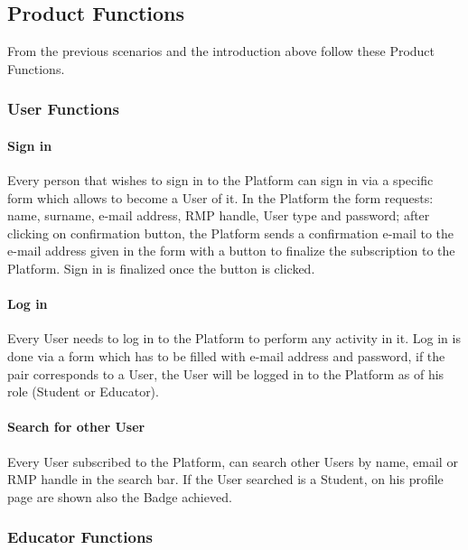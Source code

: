 \subsection{Product Functions}
From the previous scenarios and the introduction above follow these Product Functions.

\subsubsection{User Functions}
\paragraph{Sign in}
Every person that wishes to sign in to the Platform can sign in via a specific form which allows to become a User of it.
In the Platform the form requests: name, surname, e-mail address, RMP handle, User type and password; after clicking on confirmation button, the Platform sends a confirmation e-mail to the e-mail address given in the form with a 
button to finalize the subscription to the Platform. Sign in is finalized once the button is clicked.
\paragraph{Log in}
Every User needs to log in to the Platform to perform any activity in it. Log in is done via a form which has to be filled with e-mail address and password, if the pair corresponds to a User, the User will be logged in to the 
Platform as of his role (Student or Educator).
\paragraph{Search for other User}
Every User subscribed to the Platform, can search other Users by name, email or RMP handle in the search bar. If the User searched is a Student, on his profile page are shown also the Badge achieved.

\subsubsection{Educator Functions}
